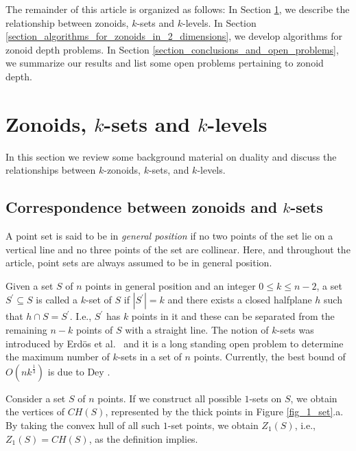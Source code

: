 \documentclass{elsart}
\begin{document}
The remainder of this article is organized as follows: In Section
\ref{section_zonoids_ksets_and_klevels}, we describe the relationship
between zonoids, $k$-sets and $k$-levels.  In Section
\ref{section_algorithms_for_zonoids_in_2_dimensions}, we develop
algorithms for zonoid depth problems.  In Section
\ref{section_conclusions_and_open_problems}, we summarize our results
and list some open problems pertaining to zonoid depth.


\section{Zonoids, $k$-sets and $k$-levels}
\label{section_zonoids_ksets_and_klevels}

In this section we review some background material on duality and
discuss the relationships between $k$-zonoids, $k$-sets, and
$k$-levels.

\subsection{Correspondence between zonoids and $k$-sets}\label{subsection_correspondence_between_zonoids_and_ksets}

A point set is said to be in \emph{general position} if no two points
of the set lie on a vertical line and no three points of the set are
collinear. Here, and throughout the article, point sets are always
assumed to be in general position.

Given a set $S$ of $n$ points in general position and an integer $0
\le k \le n-2$, a set $S^{\prime} \subseteq S$ is called a $k$-set of
$S$ if $|S^{\prime}|=k$ and there exists a closed halfplane
$h$ such that $h\cap S=S^{\prime}$. I.e., $S^{\prime}$ has $k$ points
in it and these can be separated from the remaining $n-k$ points of
$S$ with a straight line. The notion of $k$-sets was introduced by
Erd\"{o}s et al.\ \cite{dissection_graphs_of_planar_point_sets} and it
is a long standing open problem to determine the maximum number of
$k$-sets in a set of $n$ points. Currently, the best bound of
$O(nk^{\frac{1}{3}})$ is due to Dey
\cite{improved_bounds_on_planar_ksets_and_klevels}.

Consider a set $S$ of $n$ points. If we construct all possible
$1$-sets on $S$, we obtain the vertices of $CH(S)$, represented by the
thick points in Figure \ref{fig_1_set}.a. By taking the convex hull of
all such $1$-set points, we obtain $Z_1(S)$, i.e., $Z_1(S)=CH(S)$, as
the definition implies.
\end{document}
